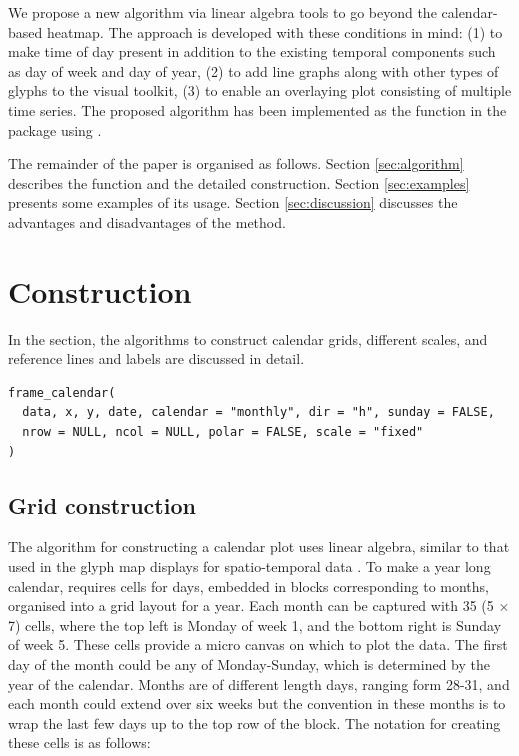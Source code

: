 \documentclass[article]{jss}
\begin{document}
We propose a new algorithm via linear algebra tools to go beyond the
calendar-based heatmap. The approach is developed with these conditions
in mind: (1) to make time of day present in addition to the existing
temporal components such as day of week and day of year, (2) to add line
graphs along with other types of glyphs to the visual toolkit, (3) to
enable an overlaying plot consisting of multiple time series. The
proposed algorithm has been implemented as the 
function in the  package \citep{R-sugrrants} using
 \citep{R-base}.

The remainder of the paper is organised as follows. Section
\ref{sec:algorithm} describes the  function and the
detailed construction. Section \ref{sec:examples} presents some examples
of its usage. Section \ref{sec:discussion} discusses the advantages and
disadvantages of the method.

\section{Construction}\label{construction}

\label{sec:algorithm}

In the section, the algorithms to construct calendar grids, different
scales, and reference lines and labels are discussed in detail.

\begin{verbatim}
frame_calendar(
  data, x, y, date, calendar = "monthly", dir = "h", sunday = FALSE, 
  nrow = NULL, ncol = NULL, polar = FALSE, scale = "fixed"
)
\end{verbatim}

\subsection{Grid construction}\label{grid-construction}

The algorithm for constructing a calendar plot uses linear algebra,
similar to that used in the glyph map displays for spatio-temporal data
\citep{Wickham2012glyph}. To make a year long calendar, requires cells
for days, embedded in blocks corresponding to months, organised into a
grid layout for a year. Each month can be captured with 35 (5 \(\times\)
7) cells, where the top left is Monday of week 1, and the bottom right
is Sunday of week 5. These cells provide a micro canvas on which to plot
the data. The first day of the month could be any of Monday-Sunday,
which is determined by the year of the calendar. Months are of different
length days, ranging form 28-31, and each month could extend over six
weeks but the convention in these months is to wrap the last few days up
to the top row of the block. The notation for creating these cells is as
follows:
\end{document}
